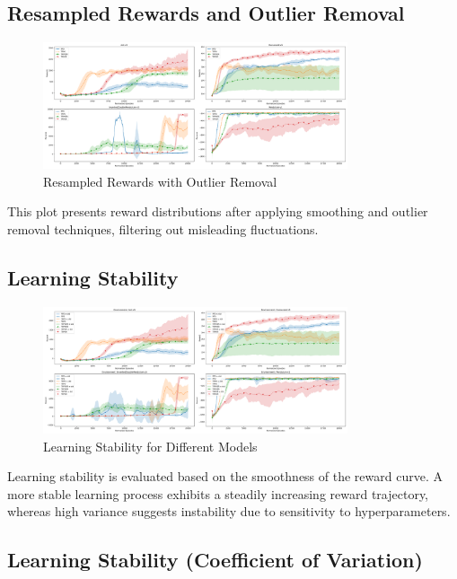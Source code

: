 \documentclass{article}
\begin{document}
\subsection*{Resampled Rewards and Outlier Removal}

\begin{figure}[H]
    \centering
    \includegraphics[width=0.8\textwidth]{.assets/resampled_outlier.png}
    \caption{Resampled Rewards with Outlier Removal}
\end{figure}

This plot presents reward distributions after applying smoothing and outlier removal techniques, filtering out misleading fluctuations.

\subsection*{Learning Stability}

\begin{figure}[H]
    \centering
    \includegraphics[width=0.8\textwidth]{.assets/learning_stability.png}
    \caption{Learning Stability for Different Models}
\end{figure}

Learning stability is evaluated based on the smoothness of the reward curve. A more stable learning process exhibits a steadily increasing reward trajectory, whereas high variance suggests instability due to sensitivity to hyperparameters.

\subsection*{Learning Stability (Coefficient of Variation)}
\end{document}
